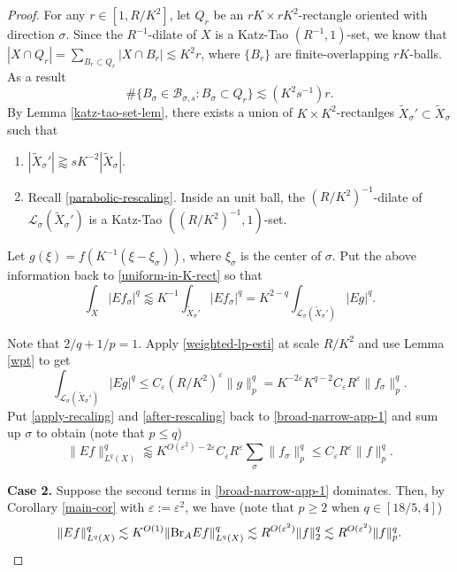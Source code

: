 \documentclass{amsart}
\numberwithin{equation}{section}
\newcommand{\e}{\varepsilon}
\newcommand{\si}{\sigma}
\newcommand{\cb}{\mathcal B}
\newcommand{\cl}{\mathcal L}
\newcommand{\wt}{\widetilde}
\newcommand{\BR}{{\rm{Br}}}
\begin{document}
\begin{proof}
For any $r\in[1,R/K^2]$, let $Q_r$ be an $rK\times rK^2$-rectangle oriented with direction $\si$.
Since the $R^{-1}$-dilate of $X$ is a Katz-Tao $(R^{-1},1)$-set, we know that $|X\cap Q_r|=\sum_{B_r\subset Q_r}|X\cap B_r|\lesssim K^2 r$, where $\{B_r\}$ are finite-overlapping $rK$-balls.
As a result
\begin{equation}
    \#\{B_\si\in\cb_{\si,s}:B_\si\subset Q_r\}\lesssim (K^2s^{-1})r.
\end{equation}
By Lemma \ref{katz-tao-set-lem}, there exists a union of $K\times K^2$-rectanlges $\wt X_\si'\subset \wt X_\si$ such that
\begin{enumerate}
    \item $|\wt X_\si'|\gtrapprox s K^{-2}|\wt X_\si|$.
    \item Recall \eqref{parabolic-rescaling}.
    Inside an unit ball, the $(R/K^2)^{-1}$-dilate of $\cl_\si(\wt X_\si')$ is a Katz-Tao $((R/K^2)^{-1},1)$-set.
\end{enumerate}
Let $g(\xi)=f(K^{-1}(\xi-\xi_\si))$, where $\xi_\si$ is the center of $\si$.
Put the above information back to \eqref{uniform-in-K-rect} so that
\begin{equation}
\label{after-rescaling}
    \int_X|Ef_\si|^q\lessapprox K^{-1}\int_{\wt X_\si'}|Ef_\si|^q=K^{2-q}\int_{\cl_\si(\wt X_\si')}|Eg|^q.
\end{equation}

Note that $2/q+1/p=1$.
Apply \eqref{weighted-lp-esti} at scale $R/K^2$ and use Lemma \ref{wpt} to get
\begin{equation}
\label{apply-recaling}
    \int_{\cl_\si(\wt X_\si')}|Eg|^q\leq C_\e (R/K^2)^{\e}\|g\|_p^q=K^{-2\e}K^{q-2}C_\e R^\e\|f_\si\|_p^q.
\end{equation}
Put \eqref{apply-recaling} and \eqref{after-rescaling} back to \eqref{broad-narrow-app-1} and sum up $\si$ to obtain (note that $p\leq q$)
\begin{equation}
    \|Ef\|_{L^q(X)}^q\lessapprox K^{O(\e^2)-2\e}C_\e R^\e\sum_\si\|f_\si\|_p^q\leq C_\e R^\e\|f\|_p^q.
\end{equation}


\smallskip

{\bf Case 2.} Suppose the second terms in \eqref{broad-narrow-app-1} dominates.
Then, by Corollary \ref{main-cor} with $\e:=\e^2$, we have (note that $p\geq 2$ when $q\in[18/5,4]$)
\begin{equation}
    \|Ef\|_{L^q(X)}^q\lesssim K^{O(1)}\|\BR_A Ef\|_{L^q(X)}^q\lesssim R^{O(\e^2)}\|f\|_2^q\lesssim R^{O(\e^2)}\|f\|_p^q. \qedhere
\end{equation}

\end{proof}
\end{document}
